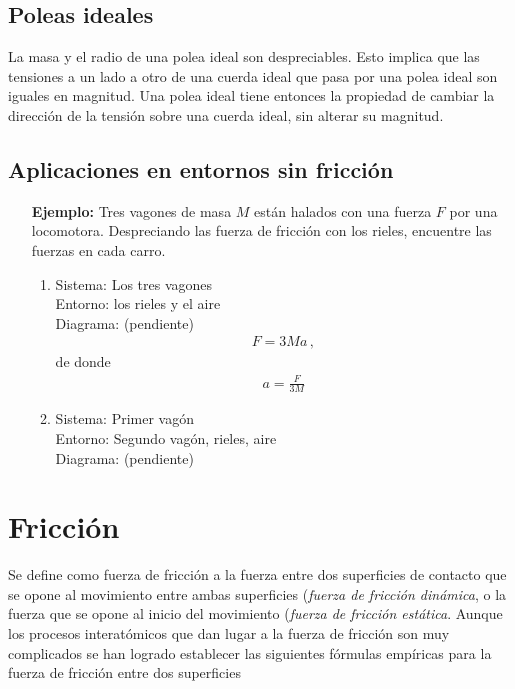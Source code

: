 \subsection{Poleas ideales}
La masa y el radio de una polea ideal son despreciables. Esto implica que las tensiones a un lado a otro de una cuerda ideal que pasa por una polea ideal son iguales en magnitud. Una polea ideal tiene entonces la propiedad de cambiar la dirección de la tensión sobre una cuerda ideal, sin alterar su magnitud.
\subsection{Aplicaciones en entornos sin fricción}







\begin{itemize}
\item[\textbf{Ejemplo:}] Tres vagones de masa $M$ están halados con una fuerza $F$ por una locomotora. Despreciando las fuerza de fricción con los rieles, encuentre las fuerzas en cada carro.
  \begin{enumerate}
  \item Sistema: Los tres vagones\\
  Entorno: los rieles y el aire\\
Diagrama: (pendiente)
  \begin{align}
    F=3M a\,,
  \end{align}
de donde
\begin{align}
  a=\frac{F}{3M}
\end{align}
\item Sistema: Primer vagón\\
Entorno: Segundo vagón, rieles, aire\\
Diagrama: (pendiente)

  \end{enumerate}
\end{itemize}
\section{Fricci\'on}

Se define como fuerza de fricción a la fuerza entre dos superficies de contacto que se opone al movimiento entre ambas superficies (\emph{fuerza de fricción dinámica}, o la fuerza que se opone al inicio del movimiento (\emph{fuerza de fricción estática}. Aunque los procesos interatómicos que dan lugar a la fuerza de fricción son muy complicados se han logrado establecer las siguientes fórmulas empíricas para la fuerza de fricción entre dos superficies

